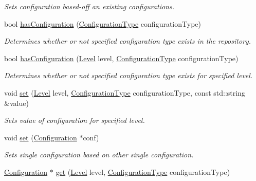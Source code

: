 \begin{DoxyCompactItemize}
\begin{DoxyCompactList}\small\item\em Sets configuration based-\/off an existing configurations. \end{DoxyCompactList}\item 
bool \hyperlink{classel_1_1_configurations_a1e812370f896b6429bf46b31fcd4e3e0}{has\+Configuration} (\hyperlink{namespaceel_a281f5db6d6163678bc68a8b23b59e124}{Configuration\+Type} configuration\+Type)
\begin{DoxyCompactList}\small\item\em Determines whether or not specified configuration type exists in the repository. \end{DoxyCompactList}\item 
bool \hyperlink{classel_1_1_configurations_a5313557efac3b0c78f973a5a1d685277}{has\+Configuration} (\hyperlink{namespaceel_ab0ac6091262344c52dd2d3ad099e8e36}{Level} level, \hyperlink{namespaceel_a281f5db6d6163678bc68a8b23b59e124}{Configuration\+Type} configuration\+Type)
\begin{DoxyCompactList}\small\item\em Determines whether or not specified configuration type exists for specified level. \end{DoxyCompactList}\item 
void \hyperlink{classel_1_1_configurations_a332717de96efc851a202b7afcc5e395c}{set} (\hyperlink{namespaceel_ab0ac6091262344c52dd2d3ad099e8e36}{Level} level, \hyperlink{namespaceel_a281f5db6d6163678bc68a8b23b59e124}{Configuration\+Type} configuration\+Type, const std\+::string \&value)
\begin{DoxyCompactList}\small\item\em Sets value of configuration for specified level. \end{DoxyCompactList}\item 
void \hyperlink{classel_1_1_configurations_a0ab07520b9409fe9f2c16a705d6936f1}{set} (\hyperlink{classel_1_1_configuration}{Configuration} $\ast$conf)
\begin{DoxyCompactList}\small\item\em Sets single configuration based on other single configuration. \end{DoxyCompactList}\item 
\hyperlink{classel_1_1_configuration}{Configuration} $\ast$ \hyperlink{classel_1_1_configurations_a6da4bc9bd6a14dc44feaf25163e998ca}{get} (\hyperlink{namespaceel_ab0ac6091262344c52dd2d3ad099e8e36}{Level} level, \hyperlink{namespaceel_a281f5db6d6163678bc68a8b23b59e124}{Configuration\+Type} configuration\+Type)

\end{DoxyCompactItemize}
